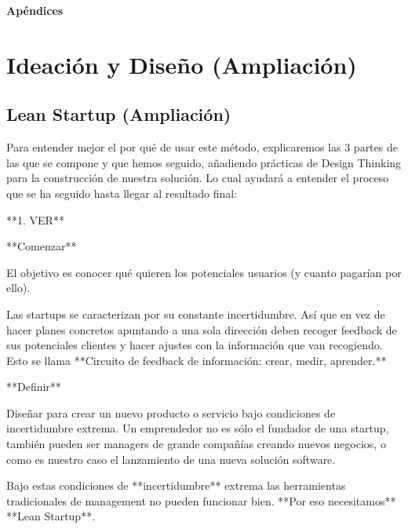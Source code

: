\documentclass[12pt,twoside,titlepage]{report}
\begin{document}

\appendix
{}
{}
\mbox{}
\vfill
\begin{center}
\begin{Huge}
\textbf{Apéndices}
\end{Huge}
\end{center}
\vfill
\mbox{}
\thispagestyle{empty}
\newpage
\mbox{}
\thispagestyle{empty}
\newpage

\chapter{Ideación y Diseño (Ampliación)}

\section{Lean Startup (Ampliación)}

Para entender mejor el por qué de usar este método, explicaremos las 3 partes de las que se compone y que hemos seguido, añadiendo prácticas de Design Thinking para la construcción de nuestra solución. Lo cual ayudará a entender el proceso que se ha seguido hasta llegar al resultado final:

**1. VER**

**Comenzar**

El objetivo es conocer qué quieren los potenciales usuarios (y cuanto pagarían por ello). 

Las startups se caracterizan por su constante incertidumbre. Así que en vez de hacer planes concretos apuntando a una sola dirección deben recoger feedback de sus potenciales clientes y hacer ajustes con la información que van recogiendo. Esto se llama **Circuito de feedback de información: crear, medir, aprender.** 

**Definir**

Diseñar para crear un nuevo producto o servicio bajo condiciones de incertidumbre extrema. Un emprendedor no es sólo el fundador de una startup, también pueden ser managers de grande compañías creando nuevos negocios, o como es nuestro caso el lanzamiento de una nueva solución software.

Bajo estas condiciones de **incertidumbre** extrema las herramientas tradicionales de management no pueden funcionar bien. **Por eso necesitamos** **Lean Startup**.
\end{document}
